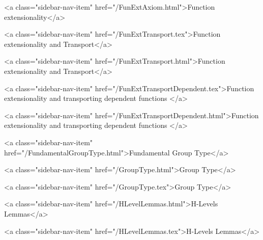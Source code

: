       
    
      
        
          <a class="sidebar-nav-item" href="/FunExtAxiom.html">Function extensionality</a>
        
      
    
      
        
          <a class="sidebar-nav-item" href="/FunExtTransport.tex">Function extensionality and Transport</a>
        
      
    
      
        
          <a class="sidebar-nav-item" href="/FunExtTransport.html">Function extensionality and Transport</a>
        
      
    
      
        
          <a class="sidebar-nav-item" href="/FunExtTransportDependent.tex">Function extensionality and transporting dependent functions </a>
        
      
    
      
        
          <a class="sidebar-nav-item" href="/FunExtTransportDependent.html">Function extensionality and transporting dependent functions </a>
        
      
    
      
        
          <a class="sidebar-nav-item" href="/FundamentalGroupType.html">Fundamental Group Type</a>
        
      
    
      
        
          <a class="sidebar-nav-item" href="/GroupType.html">Group Type</a>
        
      
    
      
        
          <a class="sidebar-nav-item" href="/GroupType.tex">Group Type</a>
        
      
    
      
        
          <a class="sidebar-nav-item" href="/HLevelLemmas.html">H-Levels Lemmas</a>
        
      
    
      
        
          <a class="sidebar-nav-item" href="/HLevelLemmas.tex">H-Levels Lemmas</a>
        
      
    
